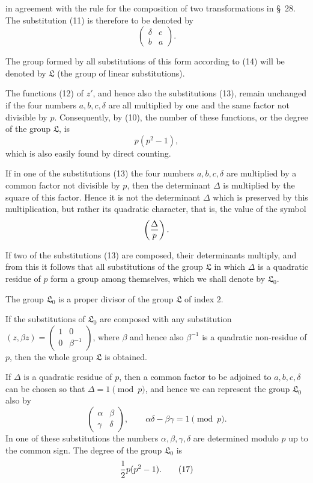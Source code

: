 \documentclass[11pt]{article}
\begin{document}
in agreement with the rule for the composition of two transformations in \S~28. The substitution (11) is therefore to be denoted by
\[
\begin{pmatrix}\delta&c\\ b&a\end{pmatrix}.
\]

The group formed by all substitutions of this form according to (14) will be denoted by $\mathfrak L$ (the group of linear substitutions).

The functions (12) of $z'$, and hence also the substitutions (13), remain unchanged if the four numbers $a,b,c,\delta$ are all multiplied by one and the same factor not divisible by $p$. Consequently, by (10), the number of these functions, or the degree of the group $\mathfrak L$, is
\begin{equation}
 p(p^2-1),
\tag{15}
\end{equation}
which is also easily found by direct counting.

If in one of the substitutions (13) the four numbers $a,b,c,\delta$ are multiplied by a common factor not divisible by $p$, then the determinant $\Delta$ is multiplied by the square of this factor. Hence it is not the determinant $\Delta$ which is preserved by this multiplication, but rather its quadratic character, that is, the value of the symbol
\[
 \left({\Delta\over p}\right).
\]

If two of the substitutions (13) are composed, their determinants multiply, and from this it follows that all substitutions of the group $\mathfrak L$ in which $\Delta$ is a quadratic residue of $p$ form a group among themselves, which we shall denote by $\mathfrak L_0$.

The group $\mathfrak L_0$ is a proper divisor of the group $\mathfrak L$ of index $2$.

If the substitutions of $\mathfrak L_0$ are composed with any substitution $(z,\beta z)=\begin{pmatrix}1&0\\0&\beta^{-1}\end{pmatrix}$, where $\beta$ and hence also $\beta^{-1}$ is a quadratic non-residue of $p$, then the whole group $\mathfrak L$ is obtained.

If $\Delta$ is a quadratic residue of $p$, then a common factor to be adjoined to $a,b,c,\delta$ can be chosen so that $\Delta=1\pmod p$, and hence we can represent the group $\mathfrak L_0$ also by
\begin{equation}
\begin{pmatrix}\alpha&\beta\\ \gamma&\delta\end{pmatrix},
\qquad
\alpha\delta-\beta\gamma=1\pmod p.
\tag{16}
\end{equation}
In one of these substitutions the numbers $\alpha,\beta,\gamma,\delta$ are determined modulo $p$ up to the common sign. The degree of the group $\mathfrak L_0$ is
\begin{equation}
 {1\over2}p(p^2-1).
\tag{17}
\end{equation}
\end{document}
